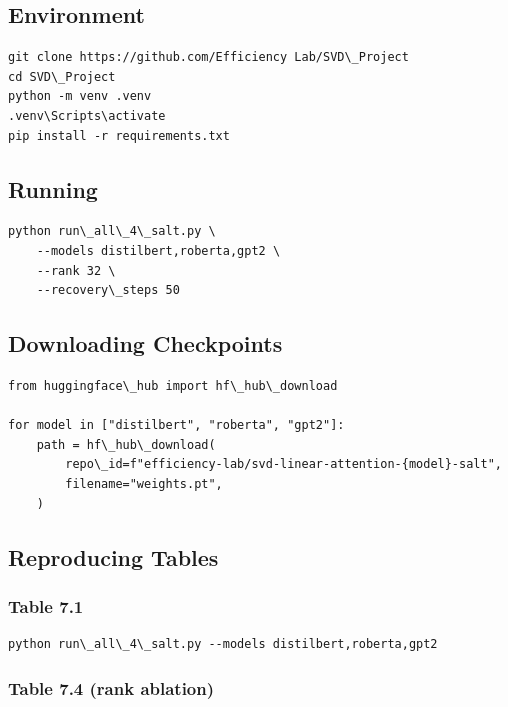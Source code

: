 \subsection{Environment}

\begin{lstlisting}
git clone https://github.com/Efficiency Lab/SVD\_Project
cd SVD\_Project
python -m venv .venv
.venv\Scripts\activate
pip install -r requirements.txt
\end{lstlisting}

\subsection{Running}

\begin{lstlisting}
python run\_all\_4\_salt.py \
    --models distilbert,roberta,gpt2 \
    --rank 32 \
    --recovery\_steps 50
\end{lstlisting}

\subsection{Downloading Checkpoints}

\begin{lstlisting}
from huggingface\_hub import hf\_hub\_download

for model in ["distilbert", "roberta", "gpt2"]:
    path = hf\_hub\_download(
        repo\_id=f"efficiency-lab/svd-linear-attention-{model}-salt",
        filename="weights.pt",
    )
\end{lstlisting}

\subsection{Reproducing Tables}

\subsubsection{Table 7.1}

\begin{lstlisting}
python run\_all\_4\_salt.py --models distilbert,roberta,gpt2
\end{lstlisting}

\subsubsection{Table 7.4 (rank ablation)}

